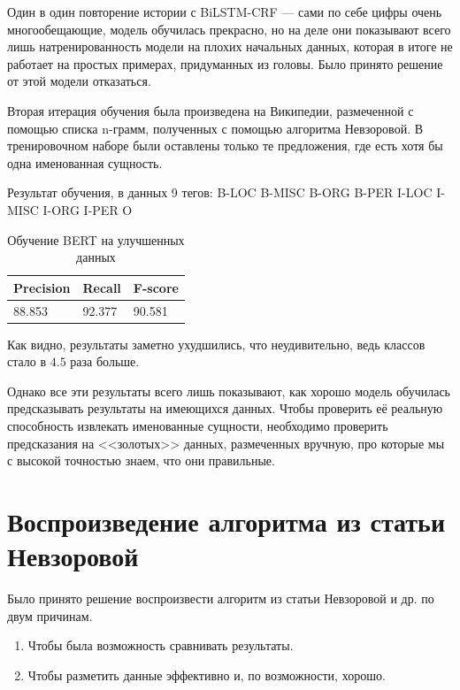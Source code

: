 \vspace{1cm}

Один в один повторение истории с BiLSTM-CRF --- сами по себе цифры очень многообещающие, модель обучилась прекрасно, но на деле они показывают всего лишь натренированность модели на плохих начальных данных, которая в итоге не работает на простых примерах, придуманных из головы. Было принято решение от этой модели отказаться. %

Вторая итерация обучения была произведена на Википедии, размеченной с помощью списка n-грамм, полученных с помощью алгоритма Невзоровой. В тренировочном наборе были оставлены только те предложения, где есть хотя бы одна именованная сущность.

Результат обучения, в данных 9 тегов:
B-LOC
B-MISC
B-ORG
B-PER
I-LOC
I-MISC
I-ORG
I-PER
O

\vspace{1cm}
\begin{table}[h]
\begin{tabular}{| l | l | l |}
\hline
Precision  &   Recall   &  F-score     \\

\hline
88.853    & 92.377    & 90.581        \\
\hline
\end{tabular}
\caption{Обучение BERT на улучшенных данных}
\end{table}

 \vspace{1cm}

Как видно, результаты заметно ухудшились, что неудивительно, ведь классов стало в $4.5$ раза больше.

Однако все эти результаты всего лишь показывают, как хорошо модель обучилась предсказывать результаты на имеющихся данных. Чтобы проверить её реальную способность извлекать именованные сущности, необходимо проверить предсказания на <<золотых>> данных, размеченных вручную, про которые мы с высокой точностью знаем, что они правильные.


\section{Воспроизведение алгоритма из статьи Невзоровой}

Было принято решение воспроизвести алгоритм из статьи Невзоровой и др. \cite{Nevzorova} по двум причинам.

\begin{enumerate}
\item Чтобы была возможность сравнивать результаты.
\item Чтобы разметить данные эффективно и, по возможности, хорошо.
\end{enumerate}

